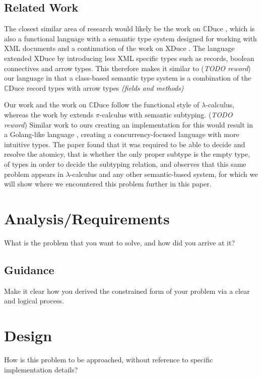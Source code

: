 \documentclass{l4proj}
\begin{document}
\section{Related Work}
The closest similar area of research would likely be the work on $\mathbb{C}$Duce 
\citep{Benzaken2003}, which is also a functional language with a semantic type system designed for 
working with XML documents and a continuation of the work on XDuce \citep{Hosoya2003}. The language
extended XDuce by introducing less XML specific types such as records, boolean connectives and arrow
types. This therefore makes it similar to (\textit{TODO reword}) our language in that a class-based 
semantic type system is a combination of the $\mathbb{C}$Duce record types with arrow types 
\textit{(fields and methods)}

Our work and the work on $\mathbb{C}$Duce follow the functional style of $\lambda$-calculus,
whereas the work by \citet{Castagna2008} extends $\pi$-calculus with semantic subtyping.
(\textit{TODO reword}) Similar work to ours creating an implementation for this would result in a 
Golang-like language \citep{Meyerson2014}, creating a concurrency-focused language with more 
intuitive types. The paper found that it was required to be able to decide and resolve the atomicy, 
that is whether the only proper subtype is the empty type, of types in order to decide the subtyping
relation, and observes that this same problem appears in $\lambda$-calculus and any other 
semantic-based system, for which we will show where we encountered this problem further in this 
paper. 

\chapter{Analysis/Requirements}
What is the problem that you want to solve, and how did you arrive at it?
\section{Guidance}
Make it clear how you derived the constrained form of your problem via a clear and logical process. 

\chapter{Design}
How is this problem to be approached, without reference to specific implementation details? 
\end{document}
